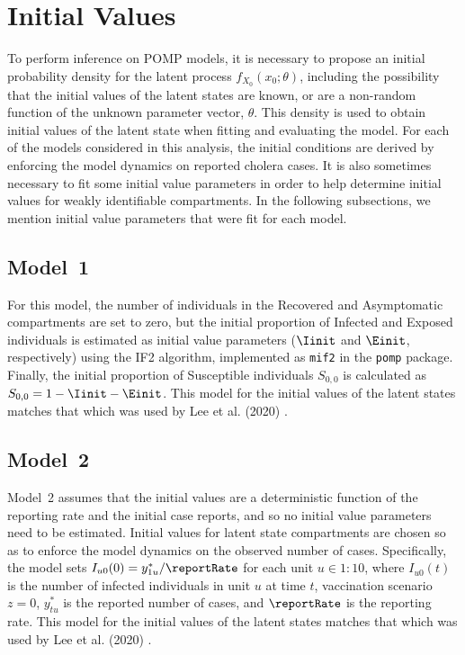 \section{Initial Values}

To perform inference on POMP models, it is necessary to propose an initial probability density for the latent process $f_{X_0}(x_0;\theta)$, including the possibility that the initial values of the latent states are known, or are a non-random function of the unknown parameter vector, $\theta$.
This density is used to obtain initial values of the latent state when fitting and evaluating the model.
For each of the models considered in this analysis, the initial conditions are derived by enforcing the model dynamics on reported cholera cases.
It is also sometimes necessary to fit some initial value parameters in order to help determine initial values for weakly identifiable compartments.
In the following subsections, we mention initial value parameters that were fit for each model.

\subsection{Model~1}

For this model, the number of individuals in the Recovered and Asymptomatic compartments are set to zero, but the initial proportion of Infected and Exposed individuals is estimated as initial value parameters ($\Iinit$ and $\Einit$, respectively) using the IF2 algorithm, implemented as \texttt{mif2} in the \texttt{pomp} package.
Finally, the initial proportion of Susceptible individuals $S_{0, 0}$ is calculated as $S_{0, 0} = 1 - \Iinit - \Einit$.
This model for the initial values of the latent states matches that which was used by Lee et al. (2020) \cite{lee20}.

\subsection{Model~2}

Model~2 assumes that the initial values are a deterministic function of the reporting rate and the initial case reports, and so no initial value parameters need to be estimated.
Initial values for latent state compartments are chosen so as to enforce the model dynamics on the observed number of cases.
Specifically, the model sets $I_{u0}(0) = y^*_{1u} / \reportRate$ for each unit $u \in 1:10$, where $I_{u0}(t)$ is the number of infected individuals in unit $u$ at time $t$, vaccination scenario $z = 0$, $y^*_{tu}$ is the reported number of cases, and $\reportRate$ is the reporting rate.
This model for the initial values of the latent states matches that which was used by Lee et al. (2020) \cite{lee20}.

